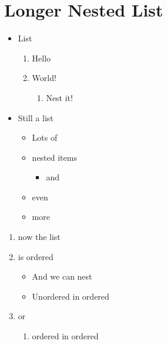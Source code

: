 \documentclass{article}
\begin{document}
\section{Longer Nested List}


\begin{itemize}
    \item List
\begin{enumerate}
    \item Hello
    \item World!
\begin{enumerate}
    \item Nest it!
\end{enumerate}
\end{enumerate}
    \item Still a list
\begin{itemize}
    \item Lots of
    \item nested items
\begin{itemize}
    \item and
\end{itemize}
    \item even
    \item more
\end{itemize}
\end{itemize}

\begin{enumerate}
    \item now the list
    \item is ordered
\begin{itemize}
    \item And we can nest
    \item Unordered in ordered
\end{itemize}
    \item or
\begin{enumerate}
    \item ordered in ordered
\end{enumerate}
\end{enumerate}
\end{document}
